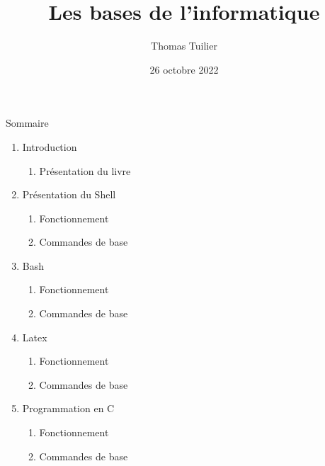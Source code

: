 \documentclass{article}
\title{Les bases de l'informatique}      %
\author{Thomas Tuilier}           %
\date{26 octobre 2022}           %
\begin{document}
\maketitle                                                                          
\newpage


{\huge Sommaire} \\

\begin{enumerate}
  
\item Introduction 
  \begin{enumerate}                                     
    \item Pr\'esentation du livre                                
  \end{enumerate}
  
\item Présentation du Shell                                        
  \begin{enumerate}                                     
    \item Fonctionnement                               
    \item Commandes de base 
  \end{enumerate}

\item Bash                                         
  \begin{enumerate}                                     
    \item Fonctionnement                               
    \item Commandes de base                                  
  \end{enumerate}

\item Latex                                        
  \begin{enumerate}                                     
    \item Fonctionnement                               
    \item Commandes de base                                  
  \end{enumerate}

\item Programmation en C                           
  \begin{enumerate}                                     
    \item Fonctionnement                               
    \item Commandes de base                                  
  \end{enumerate}
  
\end{enumerate}
\end{document}
